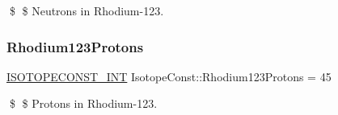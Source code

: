 \$ \$ Neutrons in Rhodium-\/123. \mbox{\label{group___isotope_const-_rhodium-_rh123_gab7e23c22405e99fd9cd141984554e6dd}} 
\subsubsection{\texorpdfstring{Rhodium123\+Protons}{Rhodium123Protons}}
{\footnotesize\ttfamily \mbox{\hyperlink{group___isotope_const-_macros_ga5f18360b3e99483a35c32d789e62621c}{I\+S\+O\+T\+O\+P\+E\+C\+O\+N\+S\+T\+\_\+\+I\+NT}} Isotope\+Const\+::\+Rhodium123\+Protons = 45}

\$ \$ Protons in Rhodium-\/123. 